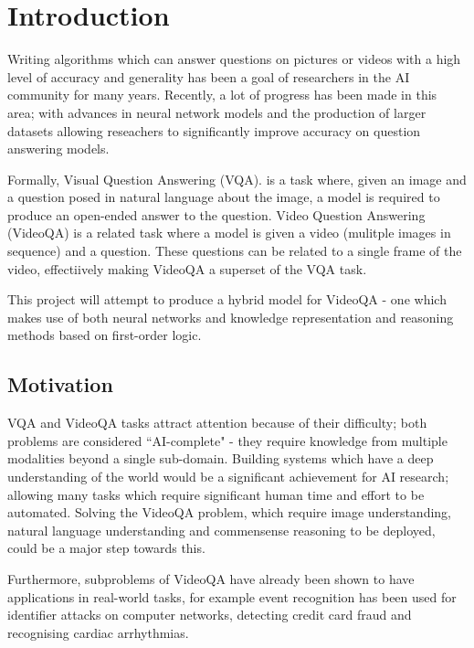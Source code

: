 


\section{Introduction}

Writing algorithms which can answer questions on pictures or videos with a high level of accuracy and generality has been a goal of researchers in the AI community for many years. Recently, a lot of progress has been made in this area; with advances in neural network models and the production of larger datasets allowing reseachers to significantly improve accuracy on question answering models.

Formally, Visual Question Answering (VQA)\cite{vqa-intro}. is a task where, given an image and a question posed in natural language about the image, a model is required to produce an open-ended answer to the question. Video Question Answering (VideoQA) is a related task where a model is given a video (mulitple images in sequence) and a question. These questions can be related to a single frame of the video, effectiively making VideoQA a superset of the VQA task.

This project will attempt to produce a hybrid model for VideoQA - one which makes use of both neural networks and knowledge representation and reasoning methods based on first-order logic. %


\subsection{Motivation}

VQA and VideoQA tasks attract attention because of their difficulty; both problems are considered ``AI-complete" - they require knowledge from multiple modalities beyond a single sub-domain\cite{def:ai-complete}. Building systems which have a deep understanding of the world would be a significant achievement for AI research; allowing many tasks which require significant human time and effort to be automated. Solving the VideoQA problem, which require image understanding, natural language understanding and commensense reasoning to be deployed, could be a major step towards this.

Furthermore, subproblems of VideoQA have already been shown to have applications in real-world tasks, for example event recognition has been used for identifier attacks on computer networks\cite{ED-uses:networks}, detecting credit card fraud\cite{ED-uses:fraud} and recognising cardiac arrhythmias\cite{ED-uses:cardiac}.

